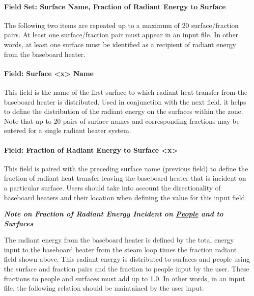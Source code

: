 \paragraph{Field Set: Surface Name, Fraction of Radiant Energy to Surface}\label{field-set-surface-name-fraction-of-radiant-energy-to-surface-1}

The following two items are repeated up to a maximum of 20 surface/fraction pairs. At least one surface/fraction pair must appear in an input file. In other words, at least one surface must be identified as a recipient of radiant energy from the baseboard heater.

\paragraph{Field: Surface \textless{}x\textgreater{} Name}\label{field-surface-x-name-1}

This field is the name of the first surface to which radiant heat transfer from the baseboard heater is distributed. Used in conjunction with the next field, it helps to define the distribution of the radiant energy on the surfaces within the zone. Note that up to 20 pairs of surface names and corresponding fractions may be entered for a single radiant heater system.

\paragraph{Field: Fraction of Radiant Energy to Surface \textless{}x\textgreater{}}\label{field-fraction-of-radiant-energy-to-surface-x-1}

This field is paired with the preceding surface name (previous field) to define the fraction of radiant heat transfer leaving the baseboard heater that is incident on a particular surface. Users should take into account the directionality of baseboard heaters and their location when defining the value for this input field.

\textbf{\emph{Note on Fraction of Radiant Energy Incident on \hyperref[people]{People} and to Surfaces}}

The radiant energy from the baseboard heater is defined by the total energy input to the baseboard heater from the steam loop times the fraction radiant field shown above. This radiant energy is distributed to surfaces and people using the surface and fraction pairs and the fraction to people input by the user. These fractions to people and surfaces must add up to 1.0. In other words, in an input file, the following relation should be maintained by the user input:

